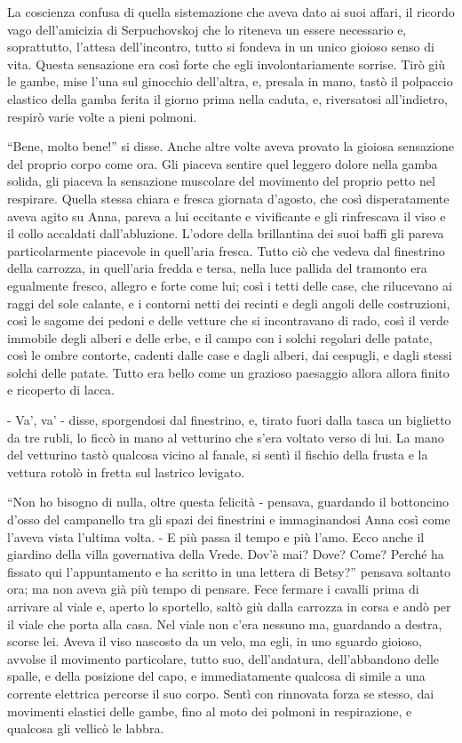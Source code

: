 La coscienza confusa di quella sistemazione che aveva dato ai suoi affari, il ricordo vago dell'amicizia di Serpuchovskoj che lo riteneva un essere necessario e, soprattutto, l'attesa dell'incontro, tutto si fondeva in un unico gioioso senso di vita. Questa sensazione era così forte che egli involontariamente sorrise. Tirò giù le gambe, mise l'una sul ginocchio dell'altra, e, presala in mano, tastò il polpaccio elastico della gamba ferita il giorno prima nella caduta, e, riversatosi all'indietro, respirò varie volte a pieni polmoni. 

``Bene, molto bene!'' si disse. Anche altre volte aveva provato la gioiosa sensazione del proprio corpo come ora. Gli piaceva sentire quel leggero dolore nella gamba solida, gli piaceva la sensazione muscolare del movimento del proprio petto nel respirare. Quella stessa chiara e fresca giornata d'agosto, che così disperatamente aveva agito su Anna, pareva a lui eccitante e vivificante e gli rinfrescava il viso e il collo accaldati dall'abluzione. L'odore della brillantina dei suoi baffi gli pareva particolarmente piacevole in quell'aria fresca. Tutto ciò che vedeva dal finestrino della carrozza, in quell'aria fredda e tersa, nella luce pallida del tramonto era egualmente fresco, allegro e forte come lui; così i tetti delle case, che rilucevano ai raggi del sole calante, e i contorni netti dei recinti e degli angoli delle costruzioni, così le sagome dei pedoni e delle vetture che si incontravano di rado, così il verde immobile degli alberi e delle erbe, e il campo con i solchi regolari delle patate, così le ombre contorte, cadenti dalle case e dagli alberi, dai cespugli, e dagli stessi solchi delle patate. Tutto era bello come un grazioso paesaggio allora allora finito e ricoperto di lacca. 

- Va', va' - disse, sporgendosi dal finestrino, e, tirato fuori dalla tasca un biglietto da tre rubli, lo ficcò in mano al vetturino che s'era voltato verso di lui. La mano del vetturino tastò qualcosa vicino al fanale, si sentì il fischio della frusta e la vettura rotolò in fretta sul lastrico levigato. 

``Non ho bisogno di nulla, oltre questa felicità - pensava, guardando il bottoncino d'osso del campanello tra gli spazi dei finestrini e immaginandosi Anna così come l'aveva vista l'ultima volta. - E più passa il tempo e più l'amo. Ecco anche il giardino della villa governativa della Vrede. Dov'è mai? Dove? Come? Perché ha fissato qui l'appuntamento e ha scritto in una lettera di Betsy?'' pensava soltanto ora; ma non aveva già più tempo di pensare. Fece fermare i cavalli prima di arrivare al viale e, aperto lo sportello, saltò giù dalla carrozza in corsa e andò per il viale che porta alla casa. Nel viale non c'era nessuno ma, guardando a destra, scorse lei. Aveva il viso nascosto da un velo, ma egli, in uno sguardo gioioso, avvolse il movimento particolare, tutto suo, dell'andatura, dell'abbandono delle spalle, e della posizione del capo, e immediatamente qualcosa di simile a una corrente elettrica percorse il suo corpo. Sentì con rinnovata forza se stesso, dai movimenti elastici delle gambe, fino al moto dei polmoni in respirazione, e qualcosa gli vellicò le labbra. 

